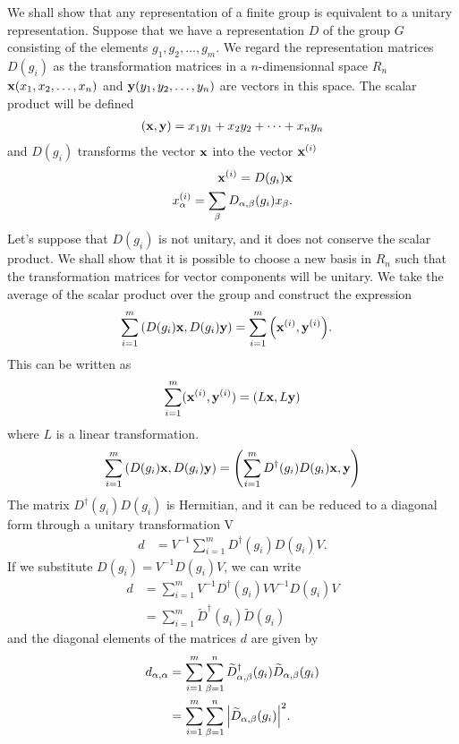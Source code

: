 We shall show that any representation of a finite group is equivalent to a
unitary representation.
Suppose that we have a representation $D$ of the group $G$ consisting of the
elements $g_1,g_2,\dots,g_m$. We regard the representation matrices $D(g_i)$
as the transformation matrices in a $n$-dimensionnal space $R_n$
$\vb{x}(x_1,x_2,\dots,x_n)$ and $\vb{y}(y_1,y_2,\dots,y_n)$ are vectors in this space.
The scalar product will be defined
\begin{align}
    (\vb{x},\vb{y})=x_1y_1+x_2y_2+\dots+x_ny_n
\end{align}
and $D(g_i)$ transforms the vector $\vb{x}$ into the vector $\vb{x}^{(i)}$
\begin{align}
    \vb{x}^{(i)}=D(g_i)\vb{x}\\
    x_\alpha^{(i)}=\sum_\beta D_{\alpha,\beta}(g_i)x_\beta.
\end{align}
Let's suppose that $D(g_i)$ is not unitary, and it does not conserve the scalar
product. We shall show that it is possible to choose a new basis in $R_n$ such
that the transformation matrices for vector components will be unitary.
We take the average of the scalar product over the group and construct the
expression
\begin{align}
    \sum_{i=1}^m\qty(D(g_i)\vb{x},D(g_i)\vb{y})&=\sum_{i=1}^m\qty(\vb{x}^{(i)},\vb{y}^{(i)}).
\end{align}
This can be written as
\begin{align}
    \sum_{i=1}^m(\vb{x}^{(i)},\vb{y}^{(i)})=\qty(L\vb{x},L\vb{y})
\end{align}
where $L$ is a linear transformation.
\begin{align}
    \sum_{i=1}^m\qty(D(g_i)\vb{x},D(g_i)\vb{y})=\qty(\sum_{i=1}^mD^\dagger(g_i)D(g_i)\vb{x},\vb{y})
\end{align}
The matrix $D^\dagger(g_i)D(g_i)$ is Hermitian, and it can be reduced to a
diagonal form through a unitary transformation V
\begin{align}
    d&=V^{-1}\sum_{i=1}^mD^\dagger(g_i)D(g_i)V.
\end{align}
If we substitute $D(g_i)=V^{-1}D(g_i)V$, we can write
\begin{align}
    d&=\sum_{i=1}^mV^{-1}D^\dagger(g_i)VV^{-1}D(g_i)V\\
     &=\sum_{i=1}^m\widetilde{D}^\dagger(g_i)\widetilde{D}(g_i)
\end{align}
and the diagonal elements of the matrices $d$ are given by
\begin{align}
    d_{\alpha,\alpha}&=\sum_{i=1}^m\sum_{\beta=1}^n\widetilde{D}^{\dagger}_{\alpha,\beta}(g_i)\widetilde{D}_{\alpha,\beta}(g_i)\\
                     &=\sum_{i=1}^m\sum_{\beta=1}^n\abs{\widetilde{D}_{\alpha,\beta}(g_i)}^2.
\end{align}
